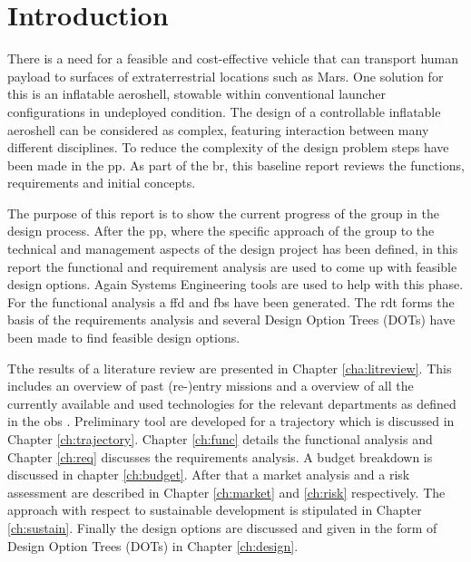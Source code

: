 \section{Introduction}\label{cha:introduction}
There is a need for a feasible and cost-effective vehicle that can transport human payload to surfaces of extraterrestrial locations such as Mars. One solution for this is an inflatable aeroshell, stowable within conventional launcher configurations in undeployed condition. The design of a controllable inflatable aeroshell can be considered as complex, featuring interaction between many different disciplines. To reduce the complexity of the design problem steps have been made in the \gls{pp}. As part of the \gls{br}, this baseline report reviews the functions, requirements and initial concepts.

The purpose of this report is to show the current progress of the group in the design process. After the \gls{pp}, where the specific approach of the group to the technical and management aspects of the design project has been defined, in this report the functional and requirement analysis are used to come up with feasible design options. Again Systems Engineering tools are used to help with this phase. For the functional analysis a \acrfull{ffd} and \acrfull{fbs} have been generated. The \acrfull{rdt} forms the basis of the requirements analysis and several Design Option Trees (DOTs) have been made to find feasible design options.

Tthe results of a literature review are presented in Chapter \ref{cha:litreview}. This includes an overview of past (re-)entry missions and a overview of all the currently available and used technologies for the relevant departments as defined in the \gls{obs} \cite{Balasooriyan2015}. Preliminary tool are developed for a trajectory which is discussed in Chapter \ref{ch:trajectory}. Chapter \ref{ch:func} details the functional analysis and Chapter \ref{ch:req} discusses the requirements analysis. A budget breakdown is discussed in chapter \ref{ch:budget}. After that a market analysis and a risk assessment are described in Chapter \ref{ch:market} and \ref{ch:risk} respectively. The approach with respect to sustainable development is stipulated in Chapter \ref{ch:sustain}. Finally the design options are discussed and given in the form of Design Option Trees (DOTs) in Chapter \ref{ch:design}. 



